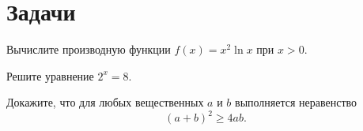 \section*{Задачи}

\begin{exercise}
Вычислите производную функции $f(x) = x^2 \ln x$ при $x > 0$.
\end{exercise}

\begin{exercise}
Решите уравнение $2^x = 8$.
\answerbox[1cm]
\end{exercise}

\begin{exercise}
Докажите, что для любых вещественных $a$ и $b$ выполняется неравенство
\[
  (a + b)^2 \geq 4ab.
\]
\end{exercise}
